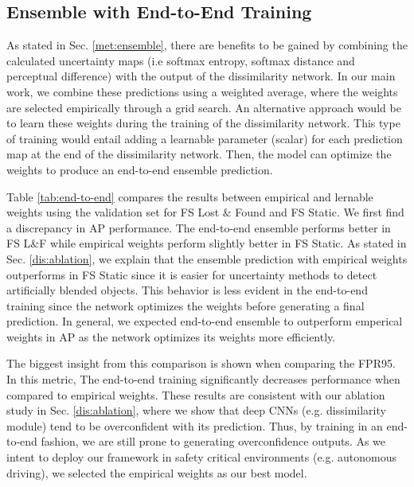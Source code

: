 \documentclass[final]{cvpr}
\begin{document}
\subsection{Ensemble with End-to-End Training}
\label{app:end-to-end}
As stated in Sec. \ref{met:ensemble}, there are benefits to be gained by combining the calculated uncertainty maps (i.e softmax entropy, softmax distance and perceptual difference) with the output of the dissimilarity network. 
In our main work, we combine these predictions using a weighted average, where the weights are selected empirically through a grid search. 
An alternative approach would be to learn these weights during the training of the dissimilarity network.
This type of training would entail adding a learnable parameter (scalar) for each prediction map at the end of the dissimilarity network. Then, the model can optimize the weights to produce an  end-to-end ensemble prediction.

Table \ref{tab:end-to-end} compares the results between empirical and lernable weights using the validation set for FS Lost \& Found and FS Static.
We first find a discrepancy in AP performance. The end-to-end ensemble performs better in FS L\&F while empirical weights perform slightly better in FS Static. 
As stated in Sec. \ref{dis:ablation}, we explain that the ensemble prediction with empirical weights outperforms in FS Static since it is easier for uncertainty methods to detect artificially blended objects. This behavior is less evident in the end-to-end training since the network optimizes the weights before generating a final prediction. 
In general, we expected end-to-end ensemble to outperform emperical weights in AP as the network optimizes its weights more efficiently.  

The biggest insight from this comparison is shown when comparing the FPR95. In this metric, The end-to-end training significantly decreases performance when compared to empirical weights. 
These results are consistent with our ablation study in Sec. \ref{dis:ablation}, where we show that deep CNNs (e.g. dissimilarity module) tend to be overconfident with its prediction. 
Thus, by training in an end-to-end fashion, we are still prone to generating overconfidence outputs. 
As we intent to deploy our framework in safety critical environments (e.g. autonomous driving), we selected the empirical weights as our best model. 
\end{document}
